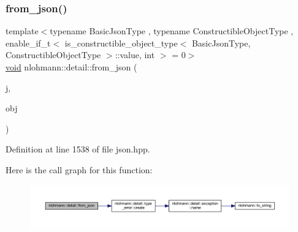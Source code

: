 \subsubsection{\texorpdfstring{from\_json()}{from\_json()}\hspace{0.1cm}{\footnotesize\ttfamily [13/18]}}
{\footnotesize\ttfamily template$<$typename Basic\+Json\+Type , typename Constructible\+Object\+Type , enable\+\_\+if\+\_\+t$<$ is\+\_\+constructible\+\_\+object\+\_\+type$<$ Basic\+Json\+Type, Constructible\+Object\+Type $>$\+::value, int $>$  = 0$>$ \\
\mbox{\hyperlink{namespacenlohmann_1_1detail_a59fca69799f6b9e366710cb9043aa77d}{void}} nlohmann\+::detail\+::from\+\_\+json (\begin{DoxyParamCaption}\item[{const Basic\+Json\+Type \&}]{j,  }\item[{Constructible\+Object\+Type \&}]{obj }\end{DoxyParamCaption})}



Definition at line 1538 of file json.\+hpp.

Here is the call graph for this function\+:
\nopagebreak
\begin{figure}[H]
\begin{center}
\leavevmode
\includegraphics[width=350pt]{namespacenlohmann_1_1detail_a5b24896e5f5db6af06d939dde4b63fe1_cgraph}
\end{center}
\end{figure}
\mbox{\label{namespacenlohmann_1_1detail_a839b0ab50d2c9bce669068f56bc41202}} 
